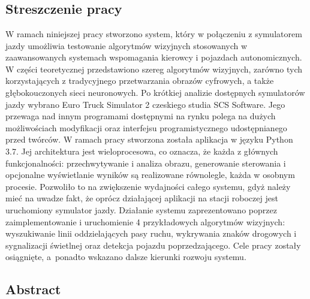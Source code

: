 \chapter*{ }
\section*{Streszczenie pracy}


W ramach niniejszej pracy stworzono system, który w połączeniu z symulatorem jazdy umożliwia testowanie algorytmów wizyjnych stosowanych w zaawansowanych systemach wspomagania kierowcy i pojazdach autonomicznych.
W części teoretycznej przedstawiono szereg algorytmów wizyjnych, zarówno tych korzystających z tradycyjnego przetwarzania obrazów cyfrowych, a także głębokouczonych sieci neuronowych.
Po krótkiej analizie dostępnych symulatorów jazdy wybrano Euro Truck Simulator 2 czeskiego studia SCS Software.
Jego przewaga nad innym programami dostępnymi na rynku polega na dużych możliwościach modyfikacji oraz interfejsu programistycznego udostępnianego przed twórców.
W ramach pracy stworzona została aplikacja w języku Python 3.7.
Jej architektura jest wieloprocesowa, co oznacza, że każda z głównych funkcjonalności: przechwytywanie i analiza obrazu, generowanie 
sterowania i opcjonalne wyświetlanie wyników są realizowane równolegle, każda w osobnym procesie.
Pozwoliło to na zwiększenie wydajności całego systemu, gdyż należy mieć na uwadze fakt, że oprócz działającej aplikacji na stacji roboczej jest uruchomiony symulator jazdy.
Działanie systemu zaprezentowano poprzez zaimplementowanie i uruchomienie 4 przykładowych algorytmów wizyjnych: wyszukiwanie linii oddzielających pasy ruchu, wykrywania znaków drogowych i sygnalizacji świetlnej oraz detekcja pojazdu poprzedzającego.
Cele pracy zostały osiągnięte, a~ponadto wskazano dalsze kierunki rozwoju systemu.



\section*{Abstract}

